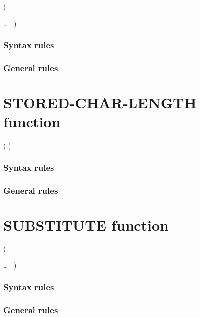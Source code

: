 \begin{syntax}
    (
  \begin{1=}
    \argument
  \end{1=}\ldots
  \ {})
\end{syntax}

\subsubsection{Syntax rules}

\subsubsection{General rules}

\section{STORED-CHAR-LENGTH function}

\begin{syntax}[\gnucobolcolour]
    ( \argument )
\end{syntax}

\subsubsection{Syntax rules}

\subsubsection{General rules}

\section{SUBSTITUTE function}

\begin{syntax}[\gnucobolcolour]
    ( \argument
  \begin{1=}
    \argument \argument
  \end{1=}\ldots\ {}
  )
\end{syntax}

\subsubsection{Syntax rules}

\subsubsection{General rules}

